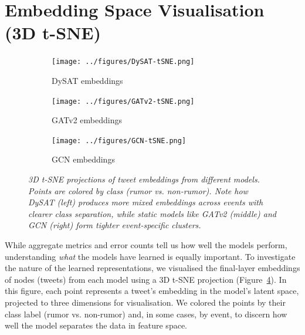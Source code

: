 \documentclass{cshonours}
\begin{document}
\section{Embedding Space Visualisation (3D t-SNE)}



\begin{figure}[htbp]
 \centering
 \begin{subfigure}{0.32\textwidth}
  \centering
  \texttt{[image: ../figures/DySAT-tSNE.png]}
  \caption{DySAT embeddings}
  \label{fig:tsne-dysat}
 \end{subfigure}
 \hfill
 \begin{subfigure}{0.32\textwidth}
  \centering
  \texttt{[image: ../figures/GATv2-tSNE.png]}
  \caption{GATv2 embeddings}
  \label{fig:tsne-gatv2}
 \end{subfigure}
 \hfill
 \begin{subfigure}{0.32\textwidth}
  \centering
  \texttt{[image: ../figures/GCN-tSNE.png]}
  \caption{GCN embeddings}
  \label{fig:tsne-gcn}
 \end{subfigure}
 \caption[t-SNE projections of tweet embeddings]{\textit{3D t-SNE projections of tweet embeddings from different models. Points are colored by class (rumor vs. non-rumor). Note how DySAT (left) produces more mixed embeddings across events with clearer class separation, while static models like GATv2 (middle) and GCN (right) form tighter event-specific clusters.}}
 \label{fig:tsne_embeddings}
\end{figure}


While aggregate metrics and error counts tell us how well the models perform, understanding \emph{what} the models have learned is equally important. To investigate the nature of the learned representations, we visualised the final-layer embeddings of nodes (tweets) from each model using a 3D t-SNE projection (Figure~\ref{fig:tsne_embeddings}). In this figure, each point represents a tweet's embedding in the model's latent space, projected to three dimensions for visualisation. We colored the points by their class label (rumor vs. non-rumor) and, in some cases, by event, to discern how well the model separates the data in feature space.
\end{document}
